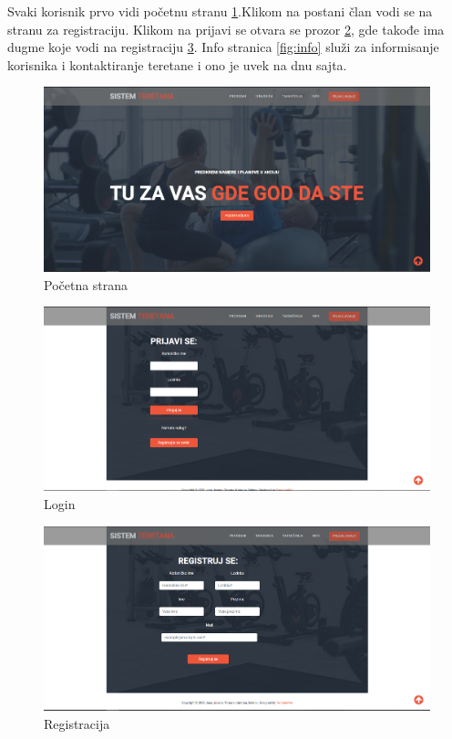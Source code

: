 \documentclass[../main.tex]{subfiles}
\begin{document}
Svaki korisnik prvo vidi početnu stranu \ref{fig:pocetna}.Klikom na postani član vodi se na stranu za registraciju. Klikom na prijavi se otvara se prozor \ref{fig:login}, gde takođe ima dugme koje vodi na registraciju \ref{fig:registracija}. Info stranica \ref{fig:info} služi za informisanje korisnika i kontaktiranje teretane i ono je uvek na dnu sajta.  
\begin{figure}[!ht]
\begin{center}
\includegraphics[scale=0.35]{sections/korisnicki_interfejs/screenshots/pocetna.PNG}
\end{center}
\caption{Početna strana}
\label{fig:pocetna}
\end{figure}


\begin{figure}[!ht]
\begin{center}
\includegraphics[scale=0.35]{sections/korisnicki_interfejs/screenshots/login.PNG}
\end{center}
\caption{Login}
\label{fig:login}
\end{figure}


\begin{figure}[!ht]
\begin{center}
\includegraphics[scale=0.35]{sections/korisnicki_interfejs/screenshots/registracija.PNG}
\end{center}
\caption{Registracija}
\label{fig:registracija}
\end{figure}
\end{document}
